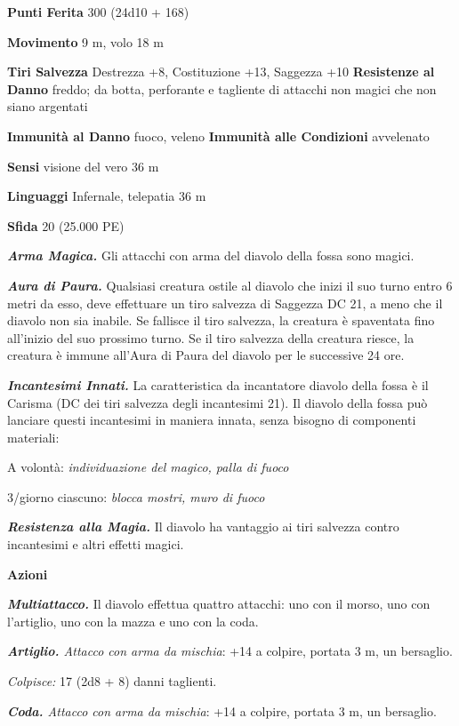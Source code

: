 \begin{multicols}{2}
\textbf{Punti Ferita} 300 (24d10 + 168)

\textbf{Movimento} 9 m, volo 18 m

\textbf{Tiri Salvezza} Destrezza +8, Costituzione +13, Saggezza +10
\textbf{Resistenze al Danno} freddo; da botta, perforante e tagliente
di attacchi non magici che non siano argentati

\textbf{Immunità al Danno} fuoco, veleno \textbf{Immunità alle
Condizioni} avvelenato

\textbf{Sensi} visione del vero 36 m

\textbf{Linguaggi} Infernale, telepatia 36 m 

\textbf{Sfida} 20 (25.000 PE)\smallskip

\emph{\textbf{Arma Magica.}} Gli attacchi con arma del diavolo della
fossa sono magici.

\emph{\textbf{Aura di Paura.}} Qualsiasi creatura ostile al diavolo che
inizi il suo turno entro 6 metri da esso, deve effettuare un tiro
salvezza di Saggezza DC 21, a meno che il diavolo non sia inabile. Se
fallisce il tiro salvezza, la creatura è spaventata fino all'inizio del
suo prossimo turno. Se il tiro salvezza della creatura riesce, la
creatura è immune all'Aura di Paura del diavolo per le successive 24
ore.

\emph{\textbf{Incantesimi Innati.}} La caratteristica da incantatore
diavolo della fossa è il Carisma (DC dei tiri salvezza degli incantesimi
21). Il diavolo della fossa può lanciare questi incantesimi in maniera
innata, senza bisogno di componenti materiali:

A volontà: \emph{individuazione del magico, palla di fuoco}

3/giorno ciascuno: \emph{blocca mostri, muro di fuoco}

\emph{\textbf{Resistenza alla Magia.}} Il diavolo ha vantaggio ai tiri
salvezza contro incantesimi e altri effetti magici.

\smallskip\textbf{Azioni}

\emph{\textbf{Multiattacco.}} Il diavolo effettua quattro attacchi: uno
con il morso, uno con l'artiglio, uno con la mazza e uno con la coda.

\emph{\textbf{Artiglio.} Attacco con arma da mischia}: +14 a colpire,
portata 3 m, un bersaglio.

\emph{Colpisce:} 17 (2d8 + 8) danni taglienti.

\emph{\textbf{Coda.} Attacco con arma da mischia}: +14 a colpire,
portata 3 m, un bersaglio.


\end{multicols}

